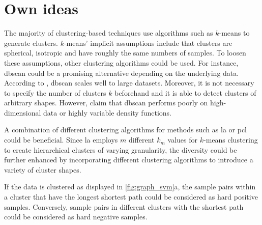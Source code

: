 \section{Own ideas}\label{sec:own_ideas}
\newcommand{\fisher}{Fisher's linear discriminant}

The majority of clustering-based techniques use algorithms such as $k$-means to generate clusters.
$k$-means' implicit assumptions include that clusters are spherical, isotropic and have roughly the same numbers of samples. %
To loosen these assumptions, other clustering algorithms could be used.
For instance, \ac{dbscan} could be a promising alternative depending on the underlying data.
According to \citet{local_aggr_2019}, \ac{dbscan} scales well to large datasets.
Moreover, it is not necessary to specify the number of clusters $k$ beforehand and 
it is able to detect clusters of arbitrary shapes.
However, \citeauthor{local_aggr_2019} claim that \ac{dbscan} performs poorly on 
high-dimensional data or highly variable density functions.

A combination of different clustering algorithms for methods such as 
\ac{la} \citet{local_aggr_2019} or \ac{pcl} \citet{PCL_2021} could be beneficial.
Since \ac{la} employs $m$ different $k_m$ values for $k$-means clustering to create hierarchical clusters 
of varying granularity, 
the diversity could be further enhanced by incorporating different clustering algorithms 
to introduce a variety of cluster shapes.


If the data is clustered as displayed in \autoref{fig:graph_svm}a,
the sample pairs within a cluster that have the longest shortest path could be considered as hard positive samples.
Conversely, sample pairs in different clusters with the shortest path could be considered as hard negative samples.

